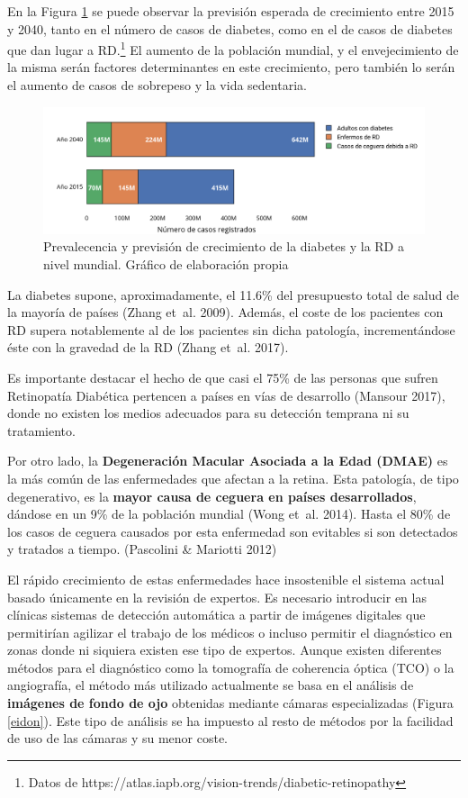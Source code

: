 \documentclass[
  12pt,
  spanish,
  a4paperpaper,
]{report}
\begin{document}
En la Figura \ref{diabetes_dr} se puede observar la previsión esperada
de crecimiento entre 2015 y 2040, tanto en el número de casos de
diabetes, como en el de casos de diabetes que dan lugar a RD.\footnote{Datos
  de https://atlas.iapb.org/vision-trends/diabetic-retinopathy} El
aumento de la población mundial, y el envejecimiento de la misma serán
factores determinantes en este crecimiento, pero también lo serán el
aumento de casos de sobrepeso y la vida sedentaria.

\begin{figure}
\centering
\includegraphics[width=1\textwidth,height=\textheight]{source/figures/stat.png}
\caption{Prevalecencia y previsión de crecimiento de la diabetes y la RD
a nivel mundial. Gráfico de elaboración propia \label{diabetes_dr}}
\end{figure}

La diabetes supone, aproximadamente, el 11.6\% del presupuesto total de
salud de la mayoría de países (Zhang et~al. 2009). Además, el coste de
los pacientes con RD supera notablemente al de los pacientes sin dicha
patología, incrementándose éste con la gravedad de la RD (Zhang et~al.
2017).

Es importante destacar el hecho de que casi el 75\% de las personas que
sufren Retinopatía Diabética pertencen a países en vías de desarrollo
(Mansour 2017), donde no existen los medios adecuados para su detección
temprana ni su tratamiento.

Por otro lado, la \textbf{Degeneración Macular Asociada a la Edad
(DMAE)} es la más común de las enfermedades que afectan a la retina.
Esta patología, de tipo degenerativo, es la \textbf{mayor causa de
ceguera en países desarrollados}, dándose en un 9\% de la población
mundial (Wong et~al. 2014). Hasta el 80\% de los casos de ceguera
causados por esta enfermedad son evitables si son detectados y tratados
a tiempo. (Pascolini \& Mariotti 2012)

El rápido crecimiento de estas enfermedades hace insostenible el sistema
actual basado únicamente en la revisión de expertos. Es necesario
introducir en las clínicas sistemas de detección automática a partir de
imágenes digitales que permitirían agilizar el trabajo de los médicos o
incluso permitir el diagnóstico en zonas donde ni siquiera existen ese
tipo de expertos. Aunque existen diferentes métodos para el diagnóstico
como la tomografía de coherencia óptica (TCO) o la angiografía, el
método más utilizado actualmente se basa en el análisis de
\textbf{imágenes de fondo de ojo} obtenidas mediante cámaras
especializadas (Figura \ref{eidon}). Este tipo de análisis se ha
impuesto al resto de métodos por la facilidad de uso de las cámaras y su
menor coste.
\end{document}
